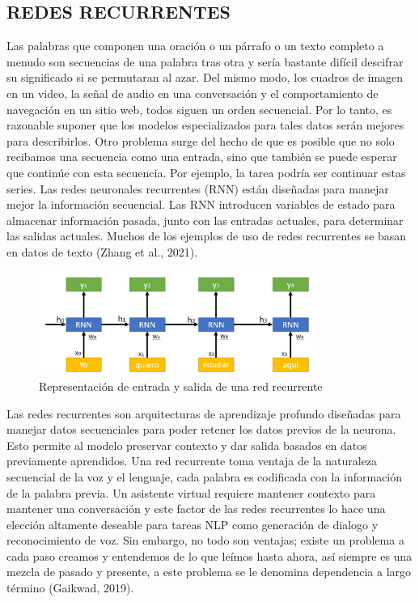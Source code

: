 \documentclass[letter, openright, 12pt]{book}
\begin{document}
\subsection{REDES RECURRENTES}
Las palabras que componen una oración o un párrafo o un texto completo a menudo son secuencias de una palabra tras otra y sería bastante difícil descifrar su significado si se permutaran al azar. Del mismo modo, los cuadros de imagen en un video, la señal de audio en una conversación y el comportamiento de navegación en un sitio web, todos siguen un orden secuencial. Por lo tanto, es razonable suponer que los modelos especializados para tales datos serán mejores para describirlos. Otro problema surge del hecho de que es posible que no solo recibamos una secuencia como una entrada, sino que también se puede esperar que continúe con esta secuencia. Por ejemplo, la tarea podría ser continuar estas series. Las redes neuronales recurrentes (RNN) están diseñadas para manejar mejor la información secuencial. Las RNN introducen variables de estado para almacenar información pasada, junto con las entradas actuales, para determinar las salidas actuales. Muchos de los ejemplos de uso de redes recurrentes se basan en datos de texto (Zhang et al., 2021).

\begin{figure}[H]
\includegraphics[width=0.8\textwidth]{figura2_8}
\caption{Representación de entrada y salida de una red recurrente }
\label{tab:figura2_8} 
\end{figure}

Las redes recurrentes son arquitecturas de aprendizaje profundo diseñadas para manejar datos secuenciales para poder retener los datos previos de la neurona. Esto permite al modelo preservar contexto y dar salida basados en datos previamente aprendidos. Una red recurrente toma ventaja de la naturaleza secuencial de la voz y el lenguaje, cada palabra es codificada con la información de la palabra previa. Un asistente virtual requiere mantener contexto para mantener una conversación y este factor de las redes recurrentes lo hace una elección altamente deseable para tareas NLP como generación de dialogo y reconocimiento de voz. Sin embargo, no todo son ventajas; existe un problema a cada paso creamos y entendemos de lo que leímos hasta ahora, así siempre es una mezcla de pasado y presente, a este problema se le denomina dependencia a largo término (Gaikwad, 2019).
\end{document}
